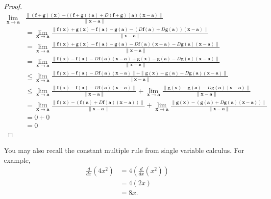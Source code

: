 \documentclass{ximera}
\begin{document}
\begin{proof}
\begin{align*}
\lim_{\mathbf{x}\rightarrow\mathbf{a}}&\frac{\|(\mathbf{f}+\mathbf{g})(\mathbf{x}) - ((\mathbf{f}+\mathbf{g})(\mathbf{a})+D(\mathbf{f}+\mathbf{g})(\mathbf{a})(\mathbf{x}-\mathbf{a})\|}{\|\mathbf{x}-\mathbf{a}\|}\\
&= \lim_{\mathbf{x}\rightarrow\mathbf{a}}\frac{\|\mathbf{f}(\mathbf{x})+\mathbf{g}(\mathbf{x}) - \mathbf{f}(\mathbf{a})-\mathbf{g}(\mathbf{a})-(D\mathbf{f}(\mathbf{a})+D\mathbf{g}(\mathbf{a}))(\mathbf{x}-\mathbf{a})\|}{\|\mathbf{x}-\mathbf{a}\|}\\
&= \lim_{\mathbf{x}\rightarrow\mathbf{a}}\frac{\|\mathbf{f}(\mathbf{x})+\mathbf{g}(\mathbf{x}) - \mathbf{f}(\mathbf{a})-\mathbf{g}(\mathbf{a})-D\mathbf{f}(\mathbf{a})(\mathbf{x}-\mathbf{a})-D\mathbf{g}(\mathbf{a})(\mathbf{x}-\mathbf{a})\|}{\|\mathbf{x}-\mathbf{a}\|}\\
&= \lim_{\mathbf{x}\rightarrow\mathbf{a}}\frac{\|\mathbf{f}(\mathbf{x}) - \mathbf{f}(\mathbf{a})-D\mathbf{f}(\mathbf{a})(\mathbf{x}-\mathbf{a})+\mathbf{g}(\mathbf{x}) - \mathbf{g}(\mathbf{a})-D\mathbf{g}(\mathbf{a})(\mathbf{x}-\mathbf{a})\|}{\|\mathbf{x}-\mathbf{a}\|}\\
&\leq \lim_{\mathbf{x}\rightarrow\mathbf{a}}\frac{\|\mathbf{f}(\mathbf{x}) - \mathbf{f}(\mathbf{a})-D\mathbf{f}(\mathbf{a})(\mathbf{x}-\mathbf{a})\|+\|\mathbf{g}(\mathbf{x}) - \mathbf{g}(\mathbf{a})-D\mathbf{g}(\mathbf{a})(\mathbf{x}-\mathbf{a})\|}{\|\mathbf{x}-\mathbf{a}\|}\\
&\leq \lim_{\mathbf{x}\rightarrow\mathbf{a}}\frac{\|\mathbf{f}(\mathbf{x}) - \mathbf{f}(\mathbf{a})-D\mathbf{f}(\mathbf{a})(\mathbf{x}-\mathbf{a})\|}{\|\mathbf{x}-\mathbf{a}\|}+\lim_{\mathbf{x}\rightarrow\mathbf{a}}\frac{\|\mathbf{g}(\mathbf{x}) - \mathbf{g}(\mathbf{a})-D\mathbf{g}(\mathbf{a})(\mathbf{x}-\mathbf{a})\|}{\|\mathbf{x}-\mathbf{a}\|}\\
&= \lim_{\mathbf{x}\rightarrow\mathbf{a}}\frac{\|\mathbf{f}(\mathbf{x}) - (\mathbf{f}(\mathbf{a})+D\mathbf{f}(\mathbf{a})(\mathbf{x}-\mathbf{a}))\|}{\|\mathbf{x}-\mathbf{a}\|}+\lim_{\mathbf{x}\rightarrow\mathbf{a}}\frac{\|\mathbf{g}(\mathbf{x}) - (\mathbf{g}(\mathbf{a})+D\mathbf{g}(\mathbf{a})(\mathbf{x}-\mathbf{a}))\|}{\|\mathbf{x}-\mathbf{a}\|}\\
&= 0 + 0\\
&= 0
\end{align*}

\end{proof}

You may also recall the constant multiple rule from single variable calculus. For example,
\begin{align*}
\frac{d}{dx}(4x^2) &= 4\left(\frac{d}{dx}(x^2)\right)\\
&= 4(2x)\\
&=8x.
\end{align*}
\end{document}
